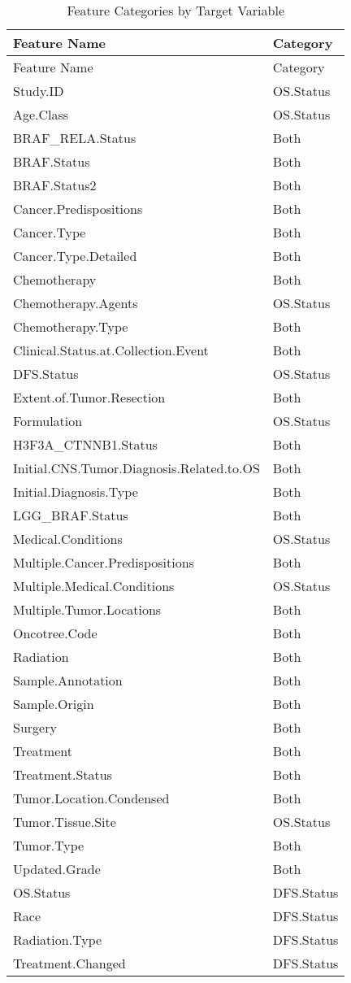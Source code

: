 \documentclass[
]{article}
\begin{document}
\begin{longtable}[]{@{}ll@{}}
\caption{Feature Categories by Target Variable}\tabularnewline
\toprule\noalign{}
Feature Name & Category \\
\midrule\noalign{}
\endfirsthead
\toprule\noalign{}
Feature Name & Category \\
\midrule\noalign{}
\endhead
\bottomrule\noalign{}
\endlastfoot
Study.ID & OS.Status \\
Age.Class & OS.Status \\
BRAF\_RELA.Status & Both \\
BRAF.Status & Both \\
BRAF.Status2 & Both \\
Cancer.Predispositions & Both \\
Cancer.Type & Both \\
Cancer.Type.Detailed & Both \\
Chemotherapy & Both \\
Chemotherapy.Agents & OS.Status \\
Chemotherapy.Type & Both \\
Clinical.Status.at.Collection.Event & Both \\
DFS.Status & OS.Status \\
Extent.of.Tumor.Resection & Both \\
Formulation & OS.Status \\
H3F3A\_CTNNB1.Status & Both \\
Initial.CNS.Tumor.Diagnosis.Related.to.OS & Both \\
Initial.Diagnosis.Type & Both \\
LGG\_BRAF.Status & Both \\
Medical.Conditions & OS.Status \\
Multiple.Cancer.Predispositions & Both \\
Multiple.Medical.Conditions & OS.Status \\
Multiple.Tumor.Locations & Both \\
Oncotree.Code & Both \\
Radiation & Both \\
Sample.Annotation & Both \\
Sample.Origin & Both \\
Surgery & Both \\
Treatment & Both \\
Treatment.Status & Both \\
Tumor.Location.Condensed & Both \\
Tumor.Tissue.Site & OS.Status \\
Tumor.Type & Both \\
Updated.Grade & Both \\
OS.Status & DFS.Status \\
Race & DFS.Status \\
Radiation.Type & DFS.Status \\
Treatment.Changed & DFS.Status \\
\end{longtable}
\end{document}
